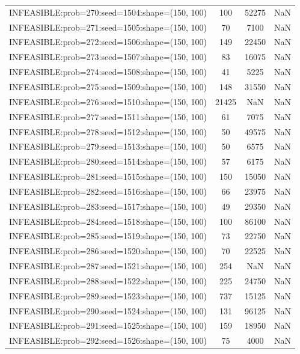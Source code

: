 \begin{longtable}{lccc}
INFEASIBLE:prob=270:seed=1504:shape=(150, 100) &   100 & 52275 &    NaN \\
INFEASIBLE:prob=271:seed=1505:shape=(150, 100) &    70 &  7100 &    NaN \\
INFEASIBLE:prob=272:seed=1506:shape=(150, 100) &   149 & 22450 &    NaN \\
INFEASIBLE:prob=273:seed=1507:shape=(150, 100) &    83 & 16075 &    NaN \\
INFEASIBLE:prob=274:seed=1508:shape=(150, 100) &    41 &  5225 &    NaN \\
INFEASIBLE:prob=275:seed=1509:shape=(150, 100) &   148 & 31550 &    NaN \\
INFEASIBLE:prob=276:seed=1510:shape=(150, 100) & 21425 &   NaN &    NaN \\
INFEASIBLE:prob=277:seed=1511:shape=(150, 100) &    61 &  7075 &    NaN \\
INFEASIBLE:prob=278:seed=1512:shape=(150, 100) &    50 & 49575 &    NaN \\
INFEASIBLE:prob=279:seed=1513:shape=(150, 100) &    50 &  6575 &    NaN \\
INFEASIBLE:prob=280:seed=1514:shape=(150, 100) &    57 &  6175 &    NaN \\
INFEASIBLE:prob=281:seed=1515:shape=(150, 100) &   150 & 15050 &    NaN \\
INFEASIBLE:prob=282:seed=1516:shape=(150, 100) &    66 & 23975 &    NaN \\
INFEASIBLE:prob=283:seed=1517:shape=(150, 100) &    49 & 29350 &    NaN \\
INFEASIBLE:prob=284:seed=1518:shape=(150, 100) &   100 & 86100 &    NaN \\
INFEASIBLE:prob=285:seed=1519:shape=(150, 100) &    73 & 22750 &    NaN \\
INFEASIBLE:prob=286:seed=1520:shape=(150, 100) &    70 & 22525 &    NaN \\
INFEASIBLE:prob=287:seed=1521:shape=(150, 100) &   254 &   NaN &    NaN \\
INFEASIBLE:prob=288:seed=1522:shape=(150, 100) &   225 & 24750 &    NaN \\
INFEASIBLE:prob=289:seed=1523:shape=(150, 100) &   737 & 15125 &    NaN \\
INFEASIBLE:prob=290:seed=1524:shape=(150, 100) &   131 & 96125 &    NaN \\
INFEASIBLE:prob=291:seed=1525:shape=(150, 100) &   159 & 18950 &    NaN \\
INFEASIBLE:prob=292:seed=1526:shape=(150, 100) &    75 &  4000 &    NaN \\

\end{longtable}
